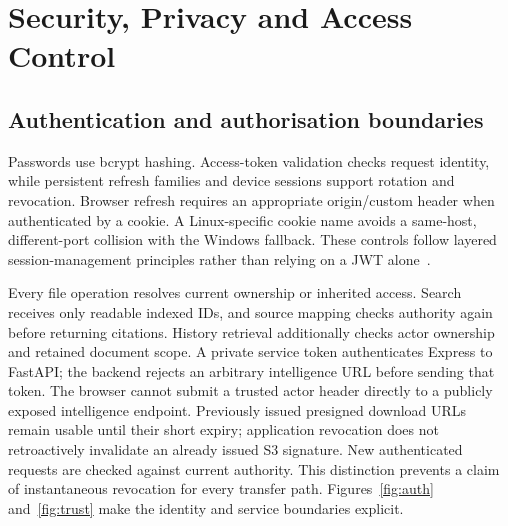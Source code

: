 \chapter{Security, Privacy and Access Control}
\section{Authentication and authorisation boundaries}
Passwords use bcrypt hashing. Access-token validation checks request identity, while persistent refresh families and device sessions support rotation and revocation. Browser refresh requires an appropriate origin/custom header when authenticated by a cookie. A Linux-specific cookie name avoids a same-host, different-port collision with the Windows fallback. These controls follow layered session-management principles rather than relying on a JWT alone~\cite{owasp}.

Every file operation resolves current ownership or inherited access. Search receives only readable indexed IDs, and source mapping checks authority again before returning citations. History retrieval additionally checks actor ownership and retained document scope. A private service token authenticates Express to FastAPI; the backend rejects an arbitrary intelligence URL before sending that token. The browser cannot submit a trusted actor header directly to a publicly exposed intelligence endpoint.
Previously issued presigned download URLs remain usable until their short expiry; application revocation does not retroactively invalidate an already issued S3 signature. New authenticated requests are checked against current authority. This distinction prevents a claim of instantaneous revocation for every transfer path.
Figures~\ref{fig:auth} and~\ref{fig:trust} make the identity and service boundaries explicit.
